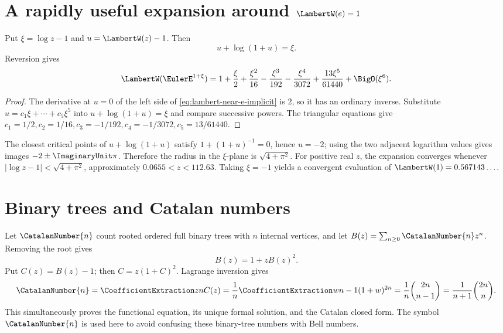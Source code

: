 \documentclass[11pt,a4paper,oneside,openany]{book}
\theoremstyle{definition}
\theoremstyle{remark}
\begin{document}
\section{A rapidly useful expansion around \texorpdfstring{$\LambertW(e)=1$}{W(e)=1}}
Put $\xi=\log z-1$ and $u=\LambertW(z)-1$.  Then
\begin{equation}\label{eq:lambert-near-e-implicit}
 u+\log(1+u)=\xi.
\end{equation}
Reversion gives
\begin{equation}\label{eq:lambert-near-e}
 \LambertW(\EulerE^{1+\xi})=1+\frac{\xi}{2}+\frac{\xi^2}{16}
 -\frac{\xi^3}{192}-\frac{\xi^4}{3072}
 +\frac{13\xi^5}{61440}+\BigO(\xi^6).
\end{equation}
\begin{proof}
The derivative at $u=0$ of the left side of
\eqref{eq:lambert-near-e-implicit} is $2$, so it has an ordinary inverse.
Substitute $u=c_1\xi+\cdots+c_5\xi^5$ into
$u+\log(1+u)=\xi$ and compare successive powers.  The triangular equations give
$c_1=1/2,c_2=1/16,c_3=-1/192,c_4=-1/3072,c_5=13/61440$.
\end{proof}
The closest critical points of $u+\log(1+u)$ satisfy
$1+(1+u)^{-1}=0$, hence $u=-2$; using the two adjacent logarithm values gives
images $-2\pm \ImaginaryUnit\pi$.  Therefore the radius in the $\xi$-plane is
$\sqrt{4+\pi^2}$.  For positive real $z$, the expansion converges whenever
$|\log z-1|<\sqrt{4+\pi^2}$, approximately
$0.0655<z<112.63$.  Taking $\xi=-1$ yields a convergent evaluation of
$\LambertW(1)=0.567143\ldots$.

\section{Binary trees and Catalan numbers}
Let $\CatalanNumber{n}$ count rooted ordered full binary trees with $n$ internal vertices, and
let $B(z)=\sum_{n\ge0}\CatalanNumber{n}z^n$.  Removing the root gives
\begin{equation}\label{eq:binary-tree-functional}
 B(z)=1+zB(z)^2.
\end{equation}
Put $C(z)=B(z)-1$; then $C=z(1+C)^2$.  Lagrange inversion gives
\begin{equation}\label{eq:catalan-lagrange}
 \CatalanNumber{n}=\CoefficientExtraction znC(z)=\frac1n\CoefficientExtraction w{n-1}(1+w)^{2n}
 =\frac1n\binom{2n}{n-1}=\frac1{n+1}\binom{2n}{n}.
\end{equation}
This simultaneously proves the functional equation, its unique formal solution,
and the Catalan closed form.  The symbol $\CatalanNumber{n}$ is used here to avoid confusing
these binary-tree numbers with Bell numbers.
\end{document}

